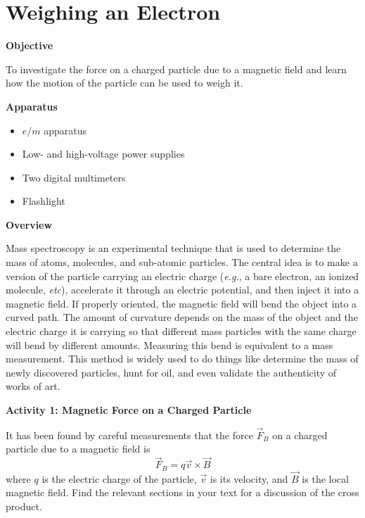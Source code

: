 \section{Weighing an Electron}

\makelabheader %

\bigskip
\textbf{Objective}

To investigate the force on a charged particle due to a magnetic field and 
learn how the motion of the particle can be used to weigh it.

\bigskip
\textbf{Apparatus}

\begin{itemize}[nosep]

\item $e/m$ apparatus

\item Low- and high-voltage power supplies

\item Two digital multimeters

\item Flashlight

\end{itemize}

\medskip
\textbf{Overview}

Mass spectroscopy is an experimental technique that is used to determine
the mass of atoms, molecules, and sub-atomic particles.
The central idea is to make a version of the particle carrying an electric
charge ({\it e.g.}, a bare electron, an ionized molecule, {\it etc}), accelerate it
through an electric potential, and then inject it into a magnetic field.
If properly oriented, the magnetic field will bend the object into
a curved path.
The amount of curvature depends on the mass of the object and the electric
charge it is carrying so that different mass particles with the same charge will
bend by different amounts.
Measuring this bend is equivalent to a mass measurement.
This method is widely used to do things like determine the mass of newly discovered particles,
hunt for oil, and even validate the authenticity of works of art.

\bigskip
\textbf{Activity 1: Magnetic Force on a Charged Particle}

It has been found by careful measurements that the force $\vec F_B$ on a charged
particle due to a magnetic field is
\begin{equation}
\vec F_B = q \vec v \times \vec B
\end{equation}
where $q$ is the electric charge of the particle, $\vec v$ is its velocity,
and $\vec B$ is the local magnetic field.
Find the relevant sections in your text for a discussion of the cross product.

